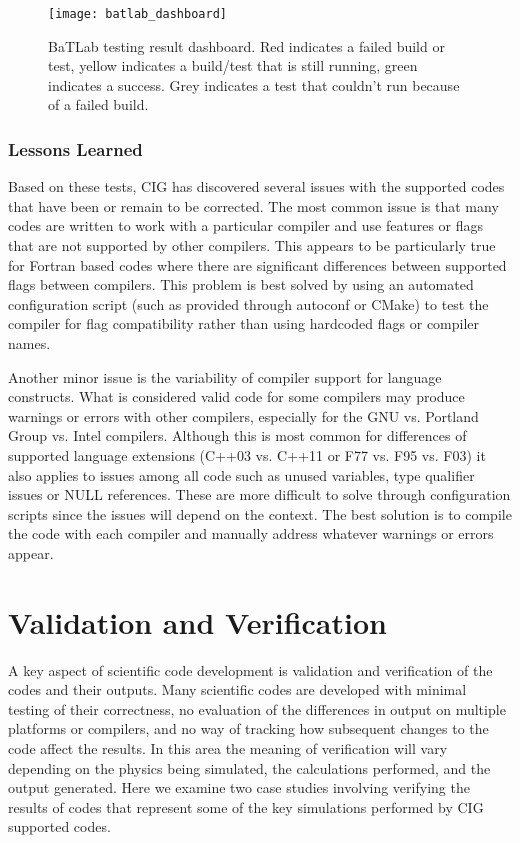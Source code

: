 \documentclass{acm_proc_article-sp}
\begin{document}
\begin{figure*}[!t]
\centering
\texttt{[image: batlab\_dashboard]}
\caption{BaTLab testing result dashboard. Red indicates a failed build or test, yellow indicates a build/test that is still running, green indicates a success. Grey indicates a test that couldn't run because of a failed build.}
\label{fig-testing-dashboard}
\end{figure*}

\subsubsection*{Lessons Learned}
Based on these tests, CIG has discovered several issues with the supported codes that have been or remain to be corrected.  The most common issue is that many codes are written to work with a particular compiler and use features or flags that are not supported by other compilers.  This appears to be particularly true for Fortran based codes where there are significant differences between supported flags between compilers.  This problem is best solved by using an automated configuration script (such as provided through autoconf or CMake) to test the compiler for flag compatibility rather than using hardcoded flags or compiler names.

Another minor issue is the variability of compiler support for language constructs.  What is considered valid code for some compilers may produce warnings or errors with other compilers, especially for the GNU vs. Portland Group vs. Intel compilers.  Although this is most common for differences of supported language extensions (C++03 vs. C++11 or F77 vs. F95 vs. F03) it also applies to issues among all code such as unused variables, type qualifier issues or NULL references.  These are more difficult to solve through configuration scripts since the issues will depend on the context.  The best solution is to compile the code with each compiler and manually address whatever warnings or errors appear.

\section{Validation and Verification}
\label{sec-vali-veri}
A key aspect of scientific code development is validation and verification of the codes and their outputs. Many scientific codes are developed with minimal testing of their correctness, no evaluation of the differences in output on multiple platforms or compilers, and no way of tracking how subsequent changes to the code affect the results. In this area the meaning of verification will vary depending on the physics being simulated, the calculations performed, and the output generated.  Here we examine two case studies involving verifying the results of codes that represent some of the key simulations performed by CIG supported codes.
\end{document}
